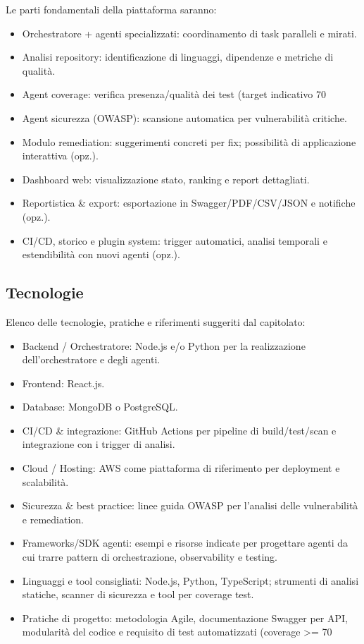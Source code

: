 \documentclass[a4paper,12pt]{article}
\begin{document}
    Le parti fondamentali della piattaforma saranno:
    \begin{itemize}
        \item Orchestratore + agenti specializzati: coordinamento di task paralleli e mirati.
        \item Analisi repository: identificazione di linguaggi, dipendenze e metriche di qualità.
        \item Agent coverage: verifica presenza/qualità dei test (target indicativo 70%
        \item Agent sicurezza (OWASP): scansione automatica per vulnerabilità critiche.
        \item Modulo remediation: suggerimenti concreti per fix; possibilità di applicazione interattiva (opz.).
        \item Dashboard web: visualizzazione stato, ranking e report dettagliati.
        \item Reportistica \& export: esportazione in Swagger/PDF/CSV/JSON e notifiche (opz.).
        \item CI/CD, storico e plugin system: trigger automatici, analisi temporali e estendibilità con nuovi agenti (opz.).
    \end{itemize}
    \subsection{Tecnologie}
    Elenco delle tecnologie, pratiche e riferimenti suggeriti dal capitolato:
    \begin{itemize}
        \item Backend / Orchestratore: Node.js e/o Python per la realizzazione dell’orchestratore e degli agenti. 
        \item Frontend: React.js.
        \item Database: MongoDB o PostgreSQL. 
        \item CI/CD \& integrazione: GitHub Actions per pipeline di build/test/scan e integrazione con i trigger di analisi. 
        \item Cloud / Hosting: AWS come piattaforma di riferimento per deployment e scalabilità. 
        \item Sicurezza \& best practice: linee guida OWASP per l’analisi delle vulnerabilità e remediation. 
        \item Frameworks/SDK agenti: esempi e risorse indicate per progettare agenti da cui trarre pattern di orchestrazione, observability e testing. 
        \item Linguaggi e tool consigliati: Node.js, Python, TypeScript; strumenti di analisi statiche, scanner di sicurezza e tool per coverage test. 
        \item Pratiche di progetto: metodologia Agile, documentazione Swagger per API, modularità del codice e requisito di test automatizzati (coverage >= 70%
    \end{itemize}   
\end{document}
